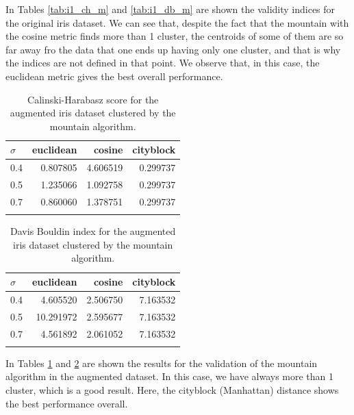 \documentclass[conference]{IEEEtran}
\begin{document}
\begin{itemize}
    In Tables \ref{tab:i1_ch_m} and \ref{tab:i1_db_m} are shown the validity indices for the original iris dataset. We can see that, despite the fact that the mountain with the cosine metric finds more than 1 cluster, the centroids of some of them are so far away fro the data that one ends up having only one cluster, and that is why the indices are not defined in that point. We observe that, in this case, the euclidean metric gives the best overall performance. \\
    
    \begin{table}[ht!]
        \centering
        \begin{tabular}{lrrr}
        \toprule
        $\sigma$ &  euclidean &    cosine &  cityblock \\
        \midrule
        0.4 &   0.807805 &  4.606519 &   0.299737 \\
        0.5 &   1.235066 &  1.092758 &   0.299737 \\
        0.7 &   0.860060 &  1.378751 &   0.299737 \\
        \bottomrule \\
        \end{tabular}
        \caption{Calinski-Harabasz score for the augmented iris dataset clustered by the mountain algorithm.}
        \label{tab:i2_ch_m}
    \end{table}
    
    \begin{table}[ht!]
        \centering
        \begin{tabular}{lrrr}
        \toprule
        $\sigma$ &  euclidean &    cosine &  cityblock \\
        \midrule
        0.4 &   4.605520 &  2.506750 &   7.163532 \\
        0.5 &  10.291972 &  2.595677 &   7.163532 \\
        0.7 &   4.561892 &  2.061052 &   7.163532 \\
        \bottomrule \\
        \end{tabular}
        \caption{Davis Bouldin index for the augmented iris dataset clustered by the mountain algorithm.}
        \label{tab:i2_db_m}
    \end{table}
    
    In Tables \ref{tab:i2_ch_m} and \ref{tab:i2_db_m} are shown the results for the validation of the mountain algorithm in the augmented dataset. In this case, we have always more than 1 cluster, which is a good result. Here, the cityblock (Manhattan) distance shows the best performance overall. \\
    

\end{itemize}
\end{document}
